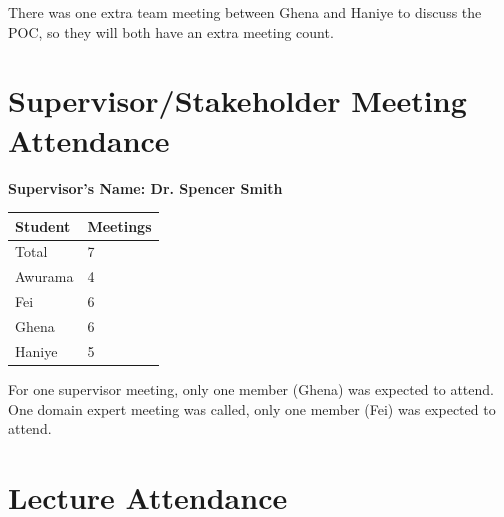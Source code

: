 \documentclass{article}
\begin{document}
There was one extra team meeting between Ghena and Haniye to discuss the POC, so they will both have an extra meeting count.
\section{Supervisor/Stakeholder Meeting Attendance}


\noindent \textbf{Supervisor's Name: Dr. Spencer Smith}

\begin{table}[H]
\centering
\begin{tabular}{ll}
\toprule
\textbf{Student} & \textbf{Meetings}\\
\midrule
Total & 7\\
Awurama & 4\\
Fei & 6\\
Ghena & 6\\
Haniye & 5\\
\bottomrule
\end{tabular}
\end{table}

For one supervisor meeting, only one member (Ghena) was expected to attend.
One domain expert meeting was called, only one member (Fei) was expected to attend.
\section{Lecture Attendance}


\end{document}
